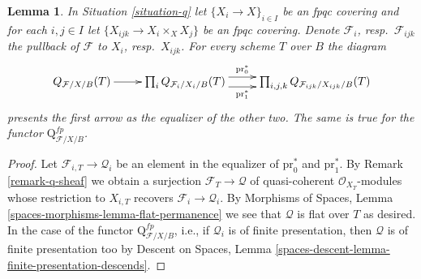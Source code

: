 \documentclass{stacks-project}
\theoremstyle{plain}
\newtheorem{lemma}[subsection]{Lemma}
\theoremstyle{definition}
\theoremstyle{remark}
\numberwithin{equation}{subsection}
\begin{document}
\begin{lemma}
\label{lemma-q-sheaf-in-X}
In Situation \ref{situation-q} let $\{X_i \to X\}_{i \in I}$ be an fpqc
covering and for each $i, j \in I$ let $\{X_{ijk} \to X_i \times_X X_j\}$
be an fpqc covering. Denote $\mathcal{F}_i$, resp.\ $\mathcal{F}_{ijk}$
the pullback of $\mathcal{F}$ to $X_i$, resp.\ $X_{ijk}$. For every scheme
$T$ over $B$ the diagram
$$
\xymatrix{
Q_{\mathcal{F}/X/B}(T) \ar[r] &
\prod\nolimits_i
Q_{\mathcal{F}_i/X_i/B}(T)
\ar@<1ex>[r]^-{\text{pr}_0^*} \ar@<-1ex>[r]_-{\text{pr}_1^*}
&
\prod\nolimits_{i, j, k}
Q_{\mathcal{F}_{ijk}/X_{ijk}/B}(T)
}
$$
presents the first arrow as the equalizer of the other two.
The same is true for the functor $\text{Q}^{fp}_{\mathcal{F}/X/B}$.
\end{lemma}

\begin{proof}
Let $\mathcal{F}_{i, T} \to \mathcal{Q}_i$ be an element in the equalizer
of $\text{pr}_0^*$ and $\text{pr}_1^*$. By Remark \ref{remark-q-sheaf}
we obtain a surjection $\mathcal{F}_T \to \mathcal{Q}$ of quasi-coherent
$\mathcal{O}_{X_T}$-modules whose restriction to $X_{i, T}$ recovers
$\mathcal{F}_i \to \mathcal{Q}_i$.
By Morphisms of Spaces, Lemma \ref{spaces-morphisms-lemma-flat-permanence}
we see that $\mathcal{Q}$ is flat over $T$ as desired.
In the case of the functor $\text{Q}^{fp}_{\mathcal{F}/X/B}$, i.e.,
if $\mathcal{Q}_i$ is of finite presentation, then
$\mathcal{Q}$ is of finite presentation too by
Descent on Spaces, Lemma
\ref{spaces-descent-lemma-finite-presentation-descends}.
\end{proof}
\end{document}

